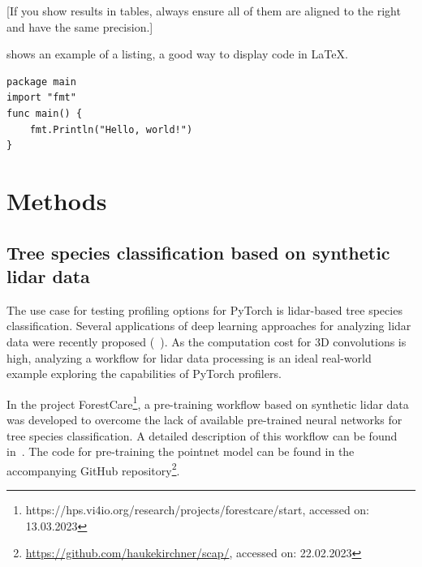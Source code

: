 \documentclass[12pt, a4paper, hidelinks]{article}
\begin{document}
[If you show results in tables, always ensure all of them are aligned to the right and have the same precision.]

 shows an example of a listing, a good way to display code in \LaTeX.

\begin{listing}
\begin{verbatim}
package main
import "fmt"
func main() {
    fmt.Println("Hello, world!")
}
\end{verbatim}
\caption{"Hello, world!" in Go}
\label{lst:hello}
\end{listing}
\fi

\pagebreak
\section{Methods}
\label{sec:methods}

\subsection{Tree species classification based on synthetic lidar data}
\label{sec:workflow}

The use case for testing profiling options for PyTorch is \ac{lidar}-based tree species classification. 
Several applications of deep learning approaches for analyzing \ac{lidar} data were recently proposed (~\cite{2017_qi_pointnet, 2021_krisanski_fsct}).
As the computation cost for 3D convolutions is high, analyzing a workflow for \ac{lidar} data processing is an ideal real-world example exploring the capabilities of PyTorch profilers.

In the project ForestCare\footnote{https://hps.vi4io.org/research/projects/forestcare/start, accessed on: 13.03.2023}, a pre-training workflow based on synthetic \ac{lidar} data was developed to overcome the lack of available pre-trained neural networks for tree species classification.
A detailed description of this workflow can be found in~.
The code for pre-training the pointnet model can be found in the accompanying GitHub repository\footnote{\url{https://github.com/haukekirchner/scap/}, accessed on: 22.02.2023}.
\end{document}
